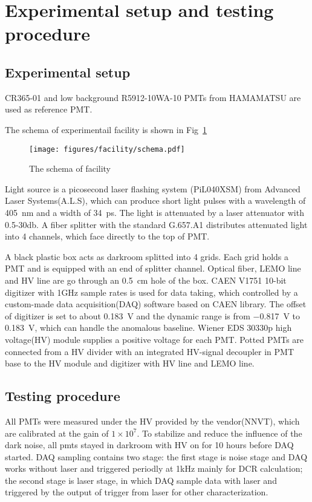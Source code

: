 \section{Experimental setup and testing procedure}
\label{SetUp}
\subsection{Experimental setup}
\label{sec:setup}
CR365-01\cite{BJBS} and low background R5912-10WA-10\cite{JPBS} PMTs from HAMAMATSU are used as reference PMT.

The schema of experimentail facility is shown in Fig~\ref{fig:facility}

\begin{figure}[!htbp]
    \centering
    \texttt{[image: figures/facility/schema.pdf]}
    \caption{The schema of facility}
    \label{fig:facility}
\end{figure}

Light source is a picosecond laser flashing system (PiL040XSM) from Advanced Laser Systems(A.L.S)\cite{NTKLaser}, which can produce short light pulses with a wavelength of \SI{405}{nm} and a width of \SI{34}{ps}. The light is attenuated by a laser attenuator with 0.5-30db. A fiber splitter with the standard G.657.A1 distributes attenuated light into 4 channels, which face directly to the top of PMT.

A black plastic box acts as darkroom splitted into 4 grids. Each grid holds a PMT and is equipped with an end of splitter channel. Optical fiber, LEMO line and HV line are go through an \SI{0.5}{cm} hole of the box. CAEN V1751 10-bit digitizer with 1GHz sample rates is used for data taking\cite{CAENV1751}, which controlled by a custom-made data acquisition(DAQ) software based on CAEN library. The offset of digitizer is set to about \SI{0.183}{V} and the dynamic range is from \SI{-0.817}{V} to \SI{0.183}{V}, which can handle the anomalous baseline. Wiener EDS 30330p high voltage(HV) module\cite{WIENERHV} supplies a positive voltage for each PMT. Potted PMTs are connected from a HV divider with an integrated HV-signal decoupler in PMT base to the HV module and digitizer with HV line and LEMO line.


\subsection{Testing procedure}
All PMTs were measured under the HV provided by the vendor(NNVT), which are calibrated at the gain of $1\times10^7$. To stabilize and reduce the influence of the dark noise, all pmts stayed in darkroom  with HV on for 10 hours before DAQ started. DAQ sampling contains two stage: the first stage is noise stage and DAQ works without laser and triggered periodly at 1kHz mainly for DCR calculation; the second stage is laser stage, in which DAQ sample data with laser and triggered by the output of trigger from laser for other characterization.